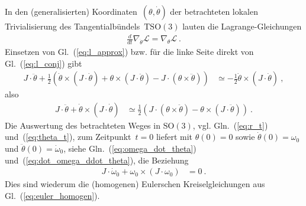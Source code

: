 \documentclass[10pt,a4paper]{article}
\begin{document}
In den (generalisierten) Koordinaten~$(\theta, \dot{\theta})$ der betrachteten lokalen Trivialisierung des Tangentialbündels~$\mathrm{T}\mathrm{SO}(3)$ lauten die Lagrange-Gleichungen
\begin{align}
	\frac{d}{dt}\nabla_{\dot{\theta}}\mathcal{L}
	=
	\nabla_{\theta}\mathcal{L}
	\ .
\end{align}
Einsetzen von Gl.~(\ref{eq:l_approx}) bzw. für die linke Seite direkt von Gl.~(\ref{eq:l_conj}) gibt
\begin{align}
	J\cdot\ddot{\theta}
	+
	\frac{1}{2}
	\left(
	\dot{\theta}\times(J\cdot\dot{\theta})
	+ \theta\times(J\cdot\ddot{\theta})
	-J\cdot
	(\theta\times\ddot{\theta})
	\right)
	&\simeq
	-\frac{1}{2}
	\dot{\theta}\times(J\cdot\dot{\theta})
	\ ,
\end{align}
also
\begin{align}
	J\cdot\ddot{\theta}
	+
	\dot{\theta}\times(J\cdot\dot{\theta})
	&\simeq
	\frac{1}{2}
	\left(
	J\cdot
	(\theta\times\ddot{\theta})
	- \theta\times(J\cdot\ddot{\theta})
	\right)
	\ .
\end{align}
Die Auswertung des betrachteten Weges in $\mathrm{SO}(3)$, vgl. Gln.~(\ref{eq:r_t}) und~(\ref{eq:theta_t}), zum Zeitpunkt~$t=0$ liefert mit $\theta(0)=0$ sowie $\dot{\theta}(0)=\omega_0$ und $\ddot{\theta}(0)=\dot{\omega}_0$, siehe Gln.~(\ref{eq:omega_dot_theta}) und~(\ref{eq:dot_omega_ddot_theta}), die Beziehung
\begin{align*}
	J\cdot\dot{\omega}_0
	+
	\omega_0\times(J\cdot\omega_0)
	&= 0
	\ .
\end{align*}
Dies sind wiederum die (homogenen) Eulerschen Kreiselgleichungen aus Gl.~(\ref{eq:euler_homogen}).
\end{document}

